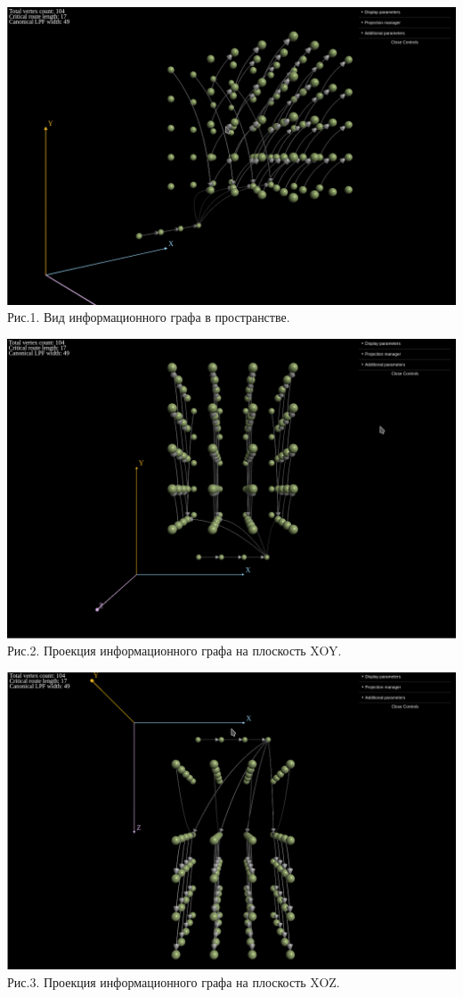 \documentclass[a4paper, 12pt]{article}
\begin{document}
	\begin{center}
		\includegraphics[scale=0.5]{src/graph_3d.png}\\
		Рис.1. Вид информационного графа в пространстве.
	\end{center}
	
	\begin{center}
		\includegraphics[scale=0.5]{src/graph_xy.png}\\
		Рис.2. Проекция информационного графа на плоскость XOY.
	\end{center}
	
	\begin{center}
		\includegraphics[scale=0.5]{src/graph_xz.png}\\
		Рис.3. Проекция информационного графа на плоскость XOZ.
	\end{center}
	
\end{document}
